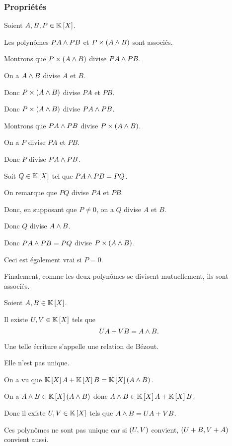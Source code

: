 \subsubsection{Propriétés}

\begin{prop}
Soient \(A,B,P\in\poly\).

Les polynômes \(PA\land PB\) et \(P\times\left(A\land B\right)\) sont associés.
\end{prop}

\begin{dem}
Montrons que \(P\times\left(A\land B\right)\) divise \(PA\land PB\).

On a \(A\land B\) divise \(A\) et \(B\).

Donc \(P\times\left(A\land B\right)\) divise \(PA\) et \(PB\).

Donc \(P\times\left(A\land B\right)\) divise \(PA\land PB\).

Montrons que \(PA\land PB\) divise \(P\times\left(A\land B\right)\).

On a \(P\) divise \(PA\) et \(PB\).

Donc \(P\) divise \(PA\land PB\).

Soit \(Q\in\poly\) tel que \(PA\land PB=PQ\).

On remarque que \(PQ\) divise \(PA\) et \(PB\).

Donc, en supposant que \(P\not=0\), on a \(Q\) divise \(A\) et \(B\).

Donc \(Q\) divise \(A\land B\).

Donc \(PA\land PB=PQ\) divise \(P\times\left(A\land B\right)\).

Ceci est également vrai si \(P=0\).

Finalement, comme les deux polynômes se divisent mutuellement, ils sont associés.
\end{dem}

\begin{defprop}
Soient \(A,B\in\poly\).

Il existe \(U,V\in\poly\) tels que \[UA+VB=A\land B.\]

Une telle écriture s'appelle une relation de Bézout.

Elle n'est pas unique.
\end{defprop}

\begin{dem}
On a vu que \(\poly A+\poly B=\poly\paren{A\et B}\).

On a \(A\et B\in\poly\paren{A\et B}\) donc \(A\et B\in\poly A+\poly B\).

Donc il existe \(U,V\in\poly\) tels que \(A\land B=UA+VB\).

Ces polynômes ne sont pas unique car si \(\left(U,V\right)\) convient, \(\left(U+B,V+A\right)\) convient aussi.
\end{dem}

